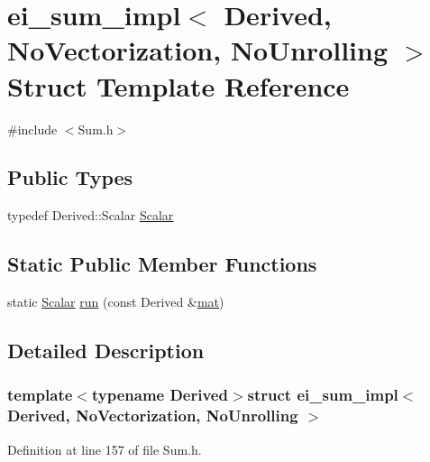 \hypertarget{structei__sum__impl_3_01_derived_00_01_no_vectorization_00_01_no_unrolling_01_4}{\section{ei\-\_\-sum\-\_\-impl$<$ Derived, No\-Vectorization, No\-Unrolling $>$ Struct Template Reference}
\label{structei__sum__impl_3_01_derived_00_01_no_vectorization_00_01_no_unrolling_01_4}
}


{\ttfamily \#include $<$Sum.\-h$>$}

\subsection*{Public Types}
\begin{DoxyCompactItemize}
\item 
typedef Derived\-::\-Scalar \hyperlink{structei__sum__impl_3_01_derived_00_01_no_vectorization_00_01_no_unrolling_01_4_a8cfdc9b42c906f3d034b63227a504b4f}{Scalar}
\end{DoxyCompactItemize}
\subsection*{Static Public Member Functions}
\begin{DoxyCompactItemize}
\item 
static \hyperlink{structei__sum__impl_3_01_derived_00_01_no_vectorization_00_01_no_unrolling_01_4_a8cfdc9b42c906f3d034b63227a504b4f}{Scalar} \hyperlink{structei__sum__impl_3_01_derived_00_01_no_vectorization_00_01_no_unrolling_01_4_a7fbcad50e88520f8cbff9f41a257305f}{run} (const Derived \&\hyperlink{uavobjecttemplate_8m_a16a51e808b16c46bbfd36da2e37cd123}{mat})
\end{DoxyCompactItemize}


\subsection{Detailed Description}
\subsubsection*{template$<$typename Derived$>$struct ei\-\_\-sum\-\_\-impl$<$ Derived, No\-Vectorization, No\-Unrolling $>$}



Definition at line 157 of file Sum.\-h.



